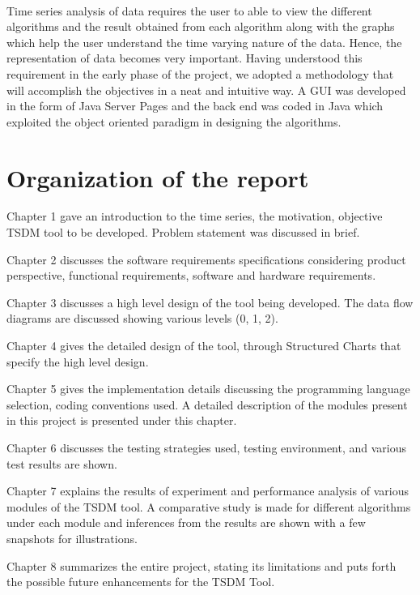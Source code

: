 \documentclass[12pt,a4paper]{report}
\begin{document}
\paragraph{} Time series analysis of data requires the user to able to view the different algorithms and the result obtained from each algorithm along with the graphs which help the user understand the time varying nature of the data. Hence, the representation of data becomes very important. Having understood this requirement in the early phase of the project, we adopted a methodology that will accomplish the objectives in a neat and intuitive way. A GUI was developed in the form of Java Server Pages and the back end was coded in Java which exploited the object oriented paradigm in designing the algorithms. 

\section{Organization of the report}
Chapter 1 gave an introduction to the time series, the motivation, objective TSDM tool to be developed. Problem statement was discussed in brief.


Chapter 2 discusses the software requirements specifications considering product perspective, functional requirements, software and hardware requirements.


Chapter 3 discusses a high level design of the tool being developed. The data flow diagrams are discussed showing various levels (0, 1, 2).

Chapter 4 gives the detailed design of the tool, through Structured Charts that specify the high level design.

Chapter 5 gives the implementation details discussing the programming language selection, coding conventions used. A detailed description of the modules present in this project is presented under this chapter.



Chapter 6 discusses the testing strategies used, testing environment, and various test results are shown.



Chapter 7 explains the results of experiment and performance analysis of various modules of the TSDM tool. A comparative study is made for different algorithms under each module and inferences from the results are shown with a few snapshots for illustrations.



Chapter 8 summarizes the entire project, stating its limitations and puts forth the possible future enhancements for the TSDM Tool.
\pagestyle{fancy}
\chead{}
\rfoot{\small{\thepage}}
\renewcommand{\headrulewidth}{0.4pt}
\renewcommand{\footrulewidth}{0.4pt}
\end{document}
